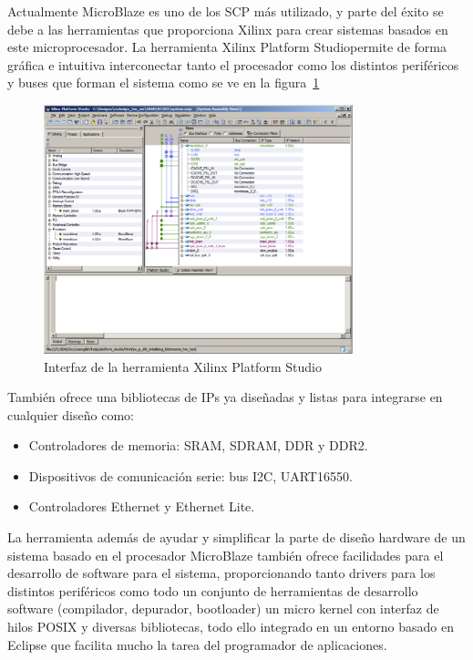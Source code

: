 Actualmente MicroBlaze es uno de los SCP más utilizado, y parte del éxito se debe
a las herramientas que proporciona Xilinx para crear sistemas basados en este
microprocesador. La herramienta Xilinx Platform Studio\cite{Etiqueta26}permite de forma gráfica e
intuitiva interconectar tanto el procesador como los distintos periféricos y buses que forman
el sistema como se ve en la figura~\ref{fig:Xilinx Platform Studio}

\begin{figure}[h!]
 	\begin{center}
  	\includegraphics[width=0.8\textwidth,keepaspectratio=true]{./images/herramientaxps}
  	\caption{Interfaz de la herramienta Xilinx Platform Studio}
  	\label{fig:Xilinx Platform Studio}
 	\end{center}
	\end{figure}

También ofrece una bibliotecas de IPs ya diseñadas y listas para integrarse en cualquier diseño como:

		\begin{itemize}
		  \item  Controladores de memoria: SRAM, SDRAM, DDR y DDR2.
	 	 \item  Dispositivos de comunicación serie: bus I2C, UART16550.
	 	 \item Controladores Ethernet y Ethernet Lite.
		\end{itemize}

La herramienta además de ayudar y simplificar la parte de diseño hardware de un sistema basado en el procesador MicroBlaze también ofrece facilidades para el desarrollo de software para el sistema, proporcionando tanto drivers para los distintos periféricos como todo un conjunto de herramientas de desarrollo software (compilador, depurador, bootloader) un micro kernel con interfaz de hilos POSIX y diversas bibliotecas, todo ello integrado en un entorno basado en Eclipse\cite{Etiqueta27} que facilita mucho la tarea del programador de aplicaciones.

